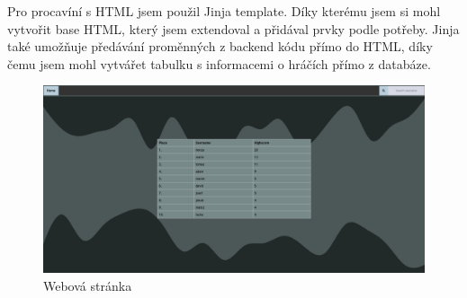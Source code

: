 Pro procavíní s HTML jsem použil Jinja template. Díky kterému jsem si mohl vytvořit base HTML, který jsem extendoval a přidával prvky podle potřeby. Jinja také umožňuje předávání proměnných z backend kódu přímo do HTML, díky čemu jsem mohl vytvářet tabulku s informacemi o hráčích přímo z databáze. 


\begin{figure}[ht!]
    \centering
    \includegraphics[scale=0.2]{images/Screenshot from 2022-04-27 20-57-42.png}
    \caption{Webová stránka}
\end{figure}